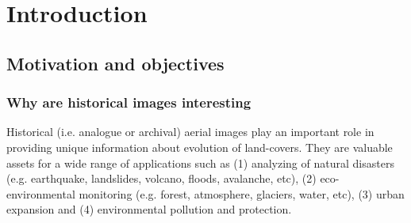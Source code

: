 
\chapter{Introduction}
\label{chap:intro}
\minitoc

\section{Motivation and objectives}
\subsection{Why are historical images interesting}
Historical (i.e. analogue or archival) aerial images play an important role in providing unique information about evolution of land-covers. 
They are valuable assets for a wide range of applications such as (1) analyzing of natural disasters (e.g. earthquake, landslides, volcano, floods, avalanche, etc), (2) eco-environmental monitoring (e.g. forest, atmosphere, glaciers, water, etc), (3) urban expansion and (4) environmental pollution and protection.


